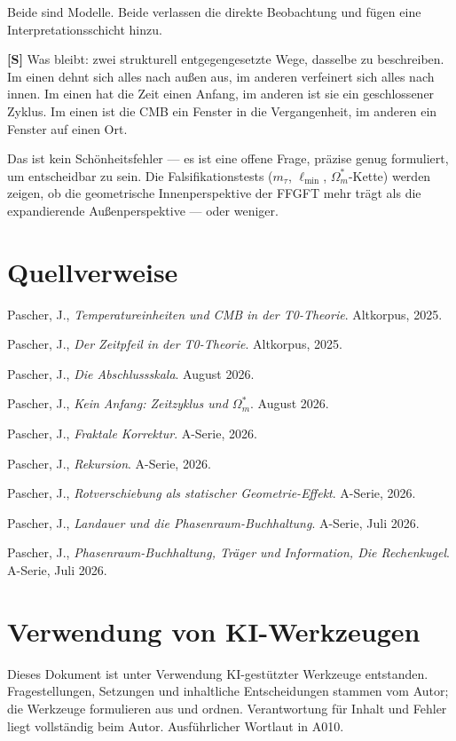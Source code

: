 Beide sind Modelle. Beide verlassen die direkte Beobachtung und
fügen eine Interpretationsschicht hinzu.

\textbf{[S]} Was bleibt: zwei strukturell entgegengesetzte Wege,
dasselbe zu beschreiben. Im einen dehnt sich alles nach außen aus,
im anderen verfeinert sich alles nach innen. Im einen hat die Zeit
einen Anfang, im anderen ist sie ein geschlossener Zyklus. Im einen
ist die CMB ein Fenster in die Vergangenheit, im anderen ein Fenster
auf einen Ort.

Das ist kein Schönheitsfehler --- es ist eine offene Frage, präzise
genug formuliert, um entscheidbar zu sein. Die Falsifikationstests
($m_\tau$, $\ell_\text{min}$, $\Omega_m^*$-Kette) werden zeigen,
ob die geometrische Innenperspektive der FFGFT mehr trägt als die
expandierende Außenperspektive --- oder weniger.

\section{Quellverweise}

\begin{description}[leftmargin=3.2em,style=sameline,itemsep=0.3em]
\small
\item[{Dok.~061}] Pascher, J., \emph{Temperatureinheiten und CMB in der
T0-Theorie}. Altkorpus, 2025.
\item[{Dok.~157}] Pascher, J., \emph{Der Zeitpfeil in der T0-Theorie}.
Altkorpus, 2025.
\item[{Dok.~312}] Pascher, J., \emph{Die Abschlussskala}. August 2026.
\item[{Dok.~313}] Pascher, J., \emph{Kein Anfang: Zeitzyklus und
$\Omega_m^*$}. August 2026.
\item[{A040}] Pascher, J., \emph{Fraktale Korrektur}. A-Serie, 2026.
\item[{A050}] Pascher, J., \emph{Rekursion}. A-Serie, 2026.
\item[{A265}] Pascher, J., \emph{Rotverschiebung als statischer
Geometrie-Effekt}. A-Serie, 2026.
\item[{A271}] Pascher, J., \emph{Landauer und die Phasenraum-Buchhaltung}.
A-Serie, Juli 2026.
\item[{A280--A282}] Pascher, J., \emph{Phasenraum-Buchhaltung, Träger
und Information, Die Rechenkugel}. A-Serie, Juli 2026.
\end{description}

\section{Verwendung von KI-Werkzeugen}

Dieses Dokument ist unter Verwendung KI-gestützter Werkzeuge entstanden.
Fragestellungen, Setzungen und inhaltliche Entscheidungen stammen vom
Autor; die Werkzeuge formulieren aus und ordnen.
Verantwortung für Inhalt und Fehler liegt vollständig beim Autor.
Ausführlicher Wortlaut in A010.
